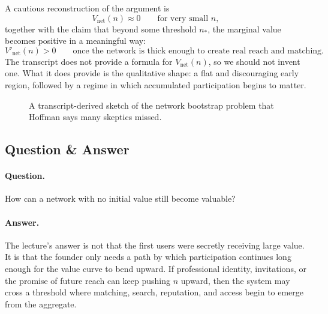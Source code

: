 A cautious reconstruction of the argument is
\begin{equation}
V_{\mathrm{net}}(n)\approx 0 \qquad \text{for very small } n,
\end{equation}
together with the claim that beyond some threshold \(n_\ast\), the marginal value becomes positive in a meaningful way:
\begin{equation}
V'_{\mathrm{net}}(n)>0 \qquad \text{once the network is thick enough to create real reach and matching.}
\end{equation}
The transcript does not provide a formula for \(V_{\mathrm{net}}(n)\), so we should not invent one. What it does provide is the qualitative shape: a flat and discouraging early region, followed by a regime in which accumulated participation begins to matter.

\begin{figure}
\begin{center}

{\small A transcript-derived sketch of the network bootstrap problem that Hoffman says many skeptics missed.}
\end{center}
\end{figure}

\subsection{Question \& Answer}

\paragraph{Question.}
How can a network with no initial value still become valuable?

\paragraph{Answer.}
The lecture's answer is not that the first users were secretly receiving large value. It is that the founder only needs a path by which participation continues long enough for the value curve to bend upward. If professional identity, invitations, or the promise of future reach can keep pushing \(n\) upward, then the system may cross a threshold where matching, search, reputation, and access begin to emerge from the aggregate.

